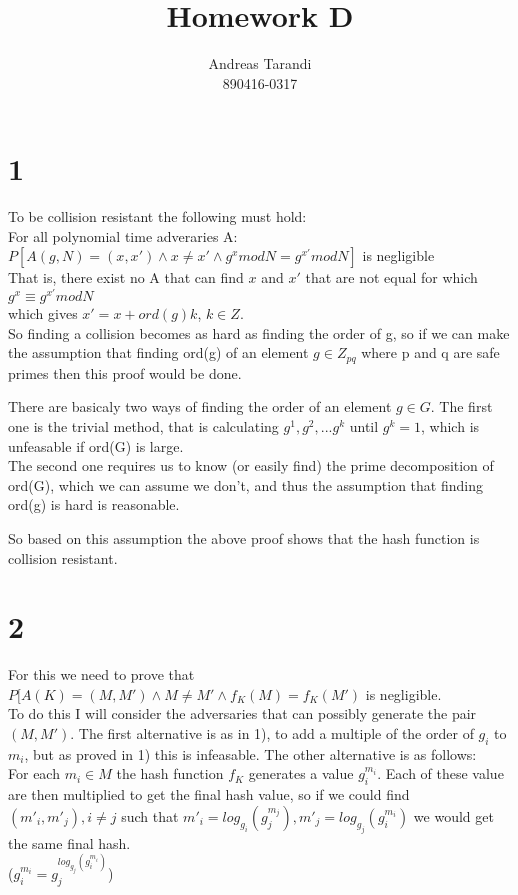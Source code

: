 \documentclass[a4paper,11pt]{article}
\author{Andreas Tarandi\\890416-0317}
\title{Homework D}
\begin{document}
	\maketitle

	\section*{1 }
		To be collision resistant the following must hold:\\
		For all polynomial time adveraries A:\\
		$P[A(g, N) = (x, x') \wedge x \neq x' \wedge g^x mod N = g^{x'} mod N]$ is negligible\\
		That is, there exist no A that can find $x$ and $x'$ that are not equal for which\\
		$g^x \equiv g^{x'} mod N$\\
		which gives $x' = x + ord(g)k$, $k \in Z$.\\
		So finding a collision becomes as hard as finding the order of g, so if we can make the assumption that finding ord(g) of an element $g \in Z_{pq}$ where p and q are safe primes then this proof would be done.

		There are basicaly two ways of finding the order of an element $g \in G$. The first one is the trivial method, that is calculating
		$g^1, g^2, ... g^k$ until $g^k = 1$, which is unfeasable if ord(G) is large. \\
		The second one requires us to know (or easily find) the prime decomposition of ord(G), which we can assume we don't, and thus the 
		assumption that finding ord(g) is hard is reasonable.

		So based on this assumption the above proof shows that the hash function is collision resistant.

	\section*{2}
		For this we need to prove that
		$P[A(K) = (M, M') \wedge M \neq M' \wedge f_K(M) = f_K(M')$ is negligible.\\
		To do this I will consider the adversaries that can possibly generate the pair $(M, M')$. The first alternative is as in 1), to
		add a multiple of the order of $g_i$ to $m_i$, but as proved in 1) this is infeasable. 
		The other alternative is as follows:\\
		For each $m_i \in M$ the hash function $f_K$ generates a value $g_i^{m_i}$. Each of these value are then multiplied to get the
		final hash value, so if we could find $(m'_i, m'_j), i \neq j$ such that $m'_i = log_{g_i}(g_j^{m_j}), m'_j = log_{g_j}(g_i^{m_i})$ 
		we would get the same final hash. \\
		($g_i^{m_i} = g_j^{log_{g_j}(g_i^{m_i})}$)\\
\end{document}
